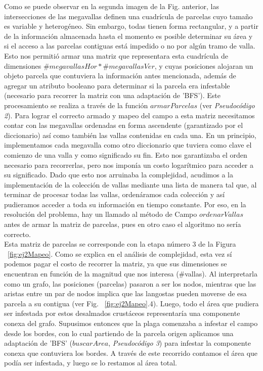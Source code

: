 Como se puede observar en la segunda imagen de la Fig. anterior, las intersecciones de las megavallas definen una cuadrícula de parcelas cuyo tamaño es variable y heterogéneo. Sin embargo, todas tienen forma rectangular, y a partir de la información almacenada hasta el momento es posible determinar su área y si el acceso a las parcelas contiguas está impedido o no por algún tramo de valla. Esto nos permitió armar una matriz que representara esta cuadrícula de dimensiones $\#megavallasHor*\#megavallasVer$, y cuyas posiciones alojaran un objeto parcela que contuviera la información antes mencionada, además de agregar un atributo booleano para determinar si la parcela era infestable (necesario para recorrer la matriz con una adaptación de 'BFS'). Este procesamiento se realiza a través de la función $armarParcelas$ (ver \textsl{Pseudocódigo 2}). Para lograr el correcto armado y mapeo del campo a esta matriz necesitamos contar con las megavallas ordenadas en forma ascendente (garantizado por el diccionario) así como también las vallas contenidas en cada una. En un principio, implementamos cada megavalla como otro diccionario que tuviera como clave el comienzo de una valla y como significado su fin. Esto nos garantizaba el orden necesario para recorrerlas, pero nos imponía un costo logarítmico para acceder a su significado. Dado que esto nos arruinaba la complejidad, acudimos a la implementación de la colección de vallas mediante una lista de manera tal que, al terminar de procesar todas las vallas, ordenáramos cada colección y así pudieramos acceder a toda su información en tiempo constante. Por eso, en la resolución del problema, hay un llamado al método de Campo $ordenarVallas$ antes de armar la matriz de parcelas, pues en otro caso el algoritmo no sería correcto.\\
\indent Esta matriz de parcelas se corresponde con la etapa número 3 de la Figura ~\ref{fig:ej2Mapeo}. Como se explica en el análisis de complejidad, esta vez sí podemos pagar el costo de recorrer la matriz, ya que sus dimensiones se encuentran en función de la magnitud que nos interesa (\#vallas). Al interpretarla como un grafo, las posiciones (parcelas) pasaron a ser los nodos, mientras que las aristas entre un par de nodos implica que las langostas pueden moverse de esa parcela a su contigua (ver Fig. ~\ref{fig:ej2Mapeo}.4). Luego, todo el área que pudiera ser infestada por estos desalmados crustáceos representaría una componente conexa del grafo. Supusimos entonces que la plaga comenzaba a infestar el campo desde los bordes, con lo cual partiendo de la parcela origen aplicamos una adaptación de 'BFS' ($buscarArea$, \textsl{Pseudocódigo 3}) para infestar la componente conexa que contuviera los bordes. A través de este recorrido contamos el área que podía ser infestada, y luego se lo restamos al área total.

